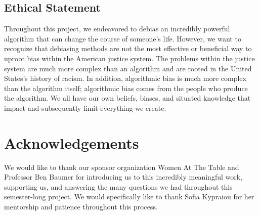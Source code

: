 \documentclass[water,article,submit,moreauthors,pdftex]{mdpi}
\begin{document}
\hypertarget{ethical-statement}{%
\subsection{Ethical Statement}\label{ethical-statement}}

Throughout this project, we endeavored to debias an incredibly powerful
algorithm that can change the course of someone's life. However, we want
to recognize that debiasing methods are not the most effective or
beneficial way to uproot bias within the American justice system. The
problems within the justice system are much more complex than an
algorithm and are rooted in the United States's history of racism. In
addition, algorithmic bias is much more complex than the algorithm
itself; algorithmic bias comes from the people who produce the
algorithm. We all have our own beliefs, biases, and situated knowledge
that impact and subsequently limit everything we create.

\hypertarget{acknowledgements}{%
\section{Acknowledgements}\label{acknowledgements}}

We would like to thank our sponsor organization Women At The Table and
Professor Ben Baumer for introducing us to this incredibly meaningful
work, supporting us, and answering the many questions we had throughout
this semester-long project. We would specifically like to thank Sofia
Kypraiou for her mentorship and patience throughout this process.

%

\vspace{6pt}




\end{document}
